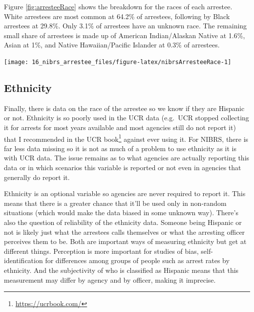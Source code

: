 \documentclass[
]{krantz}
\let\origfigure\figure
\let\endorigfigure\endfigure
\renewenvironment{figure}[1][2] {
    \expandafter\origfigure\expandafter[H]
} {
    \endorigfigure
}
\renewcommand{\href}[2]{#2\footnote{\url{#1}}}
\begin{document}
Figure \ref{fig:arresteeRace} shows the breakdown for the
races of each arrestee. White arrestees are most common at
64.2\% of arrestees, following by Black arrestees at 29.8\%.
Only 3.1\% of arrestees have an unknown race. The remaining
small share of arrestees is made up of American
Indian/Alaskan Native at 1.6\%, Asian at 1\%, and Native
Hawaiian/Pacific Islander at 0.3\% of arrestees.

\begin{figure}

{\centering \texttt{[image: 16\_nibrs\_arrestee\_files/figure-latex/nibrsArresteeRace-1]} 

}

\caption{The share of arrestees by race, 1991-2023.}\label{fig:nibrsArresteeRace}
\end{figure}

\subsection{Ethnicity}\label{ethnicity-4}

Finally, there is data on the race of the arrestee so we
know if they are Hispanic or not. Ethnicity is so poorly
used in the UCR data (e.g.~UCR stopped collecting it for
arrests for most years available and most agencies still do
not report it) that I recommended in the
\href{https://ucrbook.com/}{UCR book} against ever using it.
For NIBRS, there is far less data missing so it is not as
much of a problem to use ethnicity as it is with UCR data.
The issue remains as to what agencies are actually reporting
this data or in which scenarios this variable is reported or
not even in agencies that generally do report it.

Ethnicity is an optional variable so agencies are never
required to report it. This means that there is a greater
chance that it'll be used only in non-random situations
(which would make the data biased in some unknown way).
There's also the question of reliability of the ethnicity
data. Someone being Hispanic or not is likely just what the
arrestees calls themselves or what the arresting officer
perceives them to be. Both are important ways of measuring
ethnicity but get at different things. Perception is more
important for studies of bias, self-identification for
differences among groups of people such as arrest rates by
ethnicity. And the subjectivity of who is classified as
Hispanic means that this measurement may differ by agency
and by officer, making it imprecise.
\end{document}
